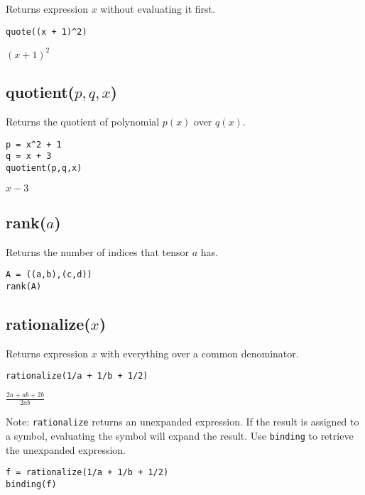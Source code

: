 Returns expression $x$ without evaluating it first.

{\color{blue}
\begin{verbatim}
quote((x + 1)^2)
\end{verbatim}
}

\noindent
$\displaystyle (x+1)^2$

\subsection*{quotient($p,q,x$)}

Returns the quotient of polynomial $p(x)$ over $q(x)$.

{\color{blue}
\begin{verbatim}
p = x^2 + 1
q = x + 3
quotient(p,q,x)
\end{verbatim}
}

\noindent
$x-3$

\subsection*{rank($a$)}

Returns the number of indices that tensor $a$ has.

{\color{blue}
\begin{verbatim}
A = ((a,b),(c,d))
rank(A)
\end{verbatim}
}


\subsection*{rationalize($x$)}

Returns expression $x$ with everything over a common denominator.

{\color{blue}
\begin{verbatim}
rationalize(1/a + 1/b + 1/2)
\end{verbatim}
}

\noindent
$\displaystyle \frac{2a+ab+2b}{2ab}$

\bigskip
\noindent
Note:
\verb$rationalize$
returns an unexpanded expression.
If the result is assigned to a symbol, evaluating the symbol will expand the result.
Use
\verb$binding$
to retrieve the unexpanded expression.

{\color{blue}
\begin{verbatim}
f = rationalize(1/a + 1/b + 1/2)
binding(f)
\end{verbatim}
}

